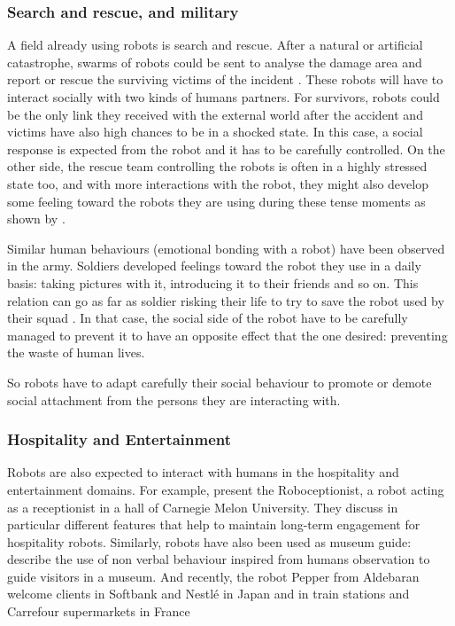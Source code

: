 \subsubsection{Search and rescue, and military} 
	
    A field already using robots is search and rescue. After a natural or
    artificial catastrophe, swarms of robots could be sent to analyse the damage
    area and report or rescue the surviving victims of the incident
    \citep{liu2013robotic}. These robots will have to interact socially with two
    kinds of humans partners. For survivors, robots could be the only link they
    received with the external world after the accident and victims have also
    high chances to be in a shocked state. In this case, a social response is
    expected from the robot and it has to be carefully controlled. On the other
    side, the rescue team controlling the robots is often in a highly stressed
    state too, and with more interactions with the robot, they might also
    develop some feeling toward the robots they are using during these tense
    moments as shown by \citet{fincannon2004evidence}.
	
    Similar human behaviours (emotional bonding with a robot) have been observed
    in the army. Soldiers developed feelings toward the robot they use in a
    daily basis: taking pictures with it, introducing it to their friends and so
    on. This relation can go as far as soldier risking their life to try to save
    the robot used by their squad \citep{singer2009wired}. In that case, the
    social side of the robot have to be carefully managed to prevent it to have
    an opposite effect that the one desired: preventing the waste of human
    lives.
	
    So robots have to adapt carefully their social behaviour to promote or
    demote social attachment from the persons they are interacting with.
	
\subsubsection{Hospitality and Entertainment} 
	
    Robots are also expected to interact with humans in the hospitality and
    entertainment domains. For example, \citet{gockley2005designing} present the
    Roboceptionist, a robot acting as a receptionist in a hall of Carnegie Melon
    University. They discuss in particular different features that help to
    maintain long-term engagement for hospitality robots. Similarly, robots have
    also been used as museum guide: \citet{karreman2012contextual} describe the
    use of non verbal behaviour inspired from humans observation to guide
    visitors in a museum. And recently, the robot Pepper from Aldebaran
    welcome clients in Softbank and Nestl\'{e} in Japan and in train stations
    and Carrefour supermarkets in France
	
